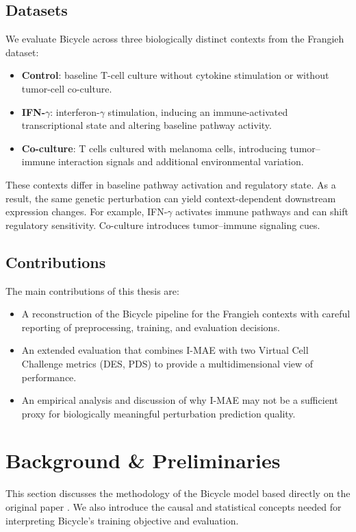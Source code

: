 \documentclass[12pt]{article}
\begin{document}
\subsection{Datasets}
We evaluate Bicycle across three biologically distinct contexts from the Frangieh dataset:
\begin{itemize}
    \item \textbf{Control}: baseline T-cell culture without cytokine stimulation or without tumor-cell co-culture.
    \item \textbf{IFN-}\(\gamma\): interferon-$\gamma$ stimulation, inducing an immune-activated transcriptional state and altering baseline pathway activity.
    \item \textbf{Co-culture}: T cells cultured with melanoma cells, introducing tumor--immune interaction signals and additional environmental variation.
\end{itemize}
These contexts differ in baseline pathway activation and regulatory state. As a result, the same genetic perturbation can yield context-dependent downstream expression changes. For example, IFN-$\gamma$ activates immune pathways and can shift regulatory sensitivity. Co-culture introduces tumor--immune signaling cues.

\subsection{Contributions}
The main contributions of this thesis are:
\begin{itemize}
    \item A reconstruction of the Bicycle pipeline for the Frangieh contexts with careful reporting
    of preprocessing, training, and evaluation decisions.
    \item An extended evaluation that combines I-MAE with two Virtual Cell Challenge metrics
    (DES, PDS) to provide a multidimensional view of performance.
    \item An empirical analysis and discussion of why I-MAE may not be a sufficient proxy for
    biologically meaningful perturbation prediction quality.
\end{itemize}

\section{Background \& Preliminaries}
This section discusses the methodology of the Bicycle model based directly on the original
paper \cite{rohbeck2024bicycle}. We also introduce the causal and statistical concepts needed
for interpreting Bicycle’s training objective and evaluation.
\end{document}
